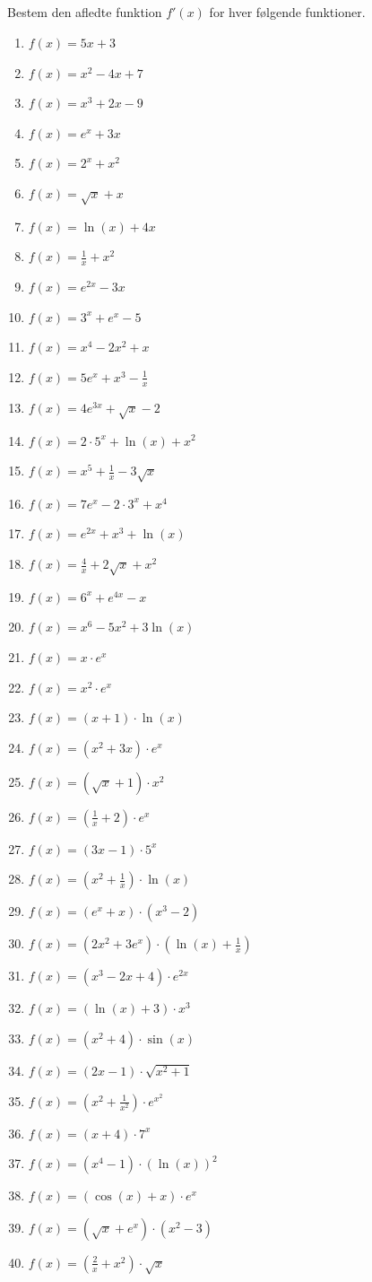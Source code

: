 \documentclass[10pt,a4paper,table]{article}
\begin{document}
\subsection{}
Bestem den afledte funktion $f'(x)$ for hver følgende funktioner.
\begin{enumerate}[label=\arabic*)]
  \item $f(x)=5x+3$
  \item $f(x)=x^2-4x+7$
  \item $f(x)=x^3+2x-9$
  \item $f(x)=e^x+3x$
  \item $f(x)=2^x+x^2$
  \item $f(x)=\sqrt{x}+x$
  \item $f(x)=\ln(x)+4x$
  \item $f(x)=\frac{1}{x}+x^2$
  \item $f(x)=e^{2x}-3x$
  \item $f(x)=3^x+e^x-5$
  \item $f(x)=x^4-2x^2+x$
  \item $f(x)=5e^x+x^3-\frac{1}{x}$
  \item $f(x)=4e^{3x}+\sqrt{x}-2$
  \item $f(x)=2\cdot 5^x+\ln(x)+x^2$
  \item $f(x)=x^5+\frac{1}{x}-3\sqrt{x}$
  \item $f(x)=7e^x-2\cdot 3^x+x^4$
  \item $f(x)=e^{2x}+x^3+\ln(x)$
  \item $f(x)=\frac{4}{x}+2\sqrt{x}+x^2$
  \item $f(x)=6^x+e^{4x}-x$
  \item $f(x)=x^6-5x^2+3\ln(x)$
  \item $f(x)=x\cdot e^x$
  \item $f(x)=x^2\cdot e^x$
  \item $f(x)=(x+1)\cdot \ln(x)$
  \item $f(x)=(x^2+3x)\cdot e^x$
  \item $f(x)=(\sqrt{x}+1)\cdot x^2$
  \item $f(x)=\left(\frac{1}{x}+2\right)\cdot e^x$
  \item $f(x)=(3x-1)\cdot 5^x$
  \item $f(x)=\left(x^2+\frac{1}{x}\right)\cdot \ln(x)$
  \item $f(x)=(e^x+x)\cdot (x^3-2)$
  \item $f(x)=(2x^2+3e^x)\cdot \left(\ln(x)+\frac{1}{x}\right)$
  \item $f(x)=(x^3-2x+4)\cdot e^{2x}$
  \item $f(x)=(\ln(x)+3)\cdot x^3$
  \item $f(x)=(x^2+4)\cdot \sin(x)$
  \item $f(x)=(2x-1)\cdot \sqrt{x^2+1}$
  \item $f(x)=\left(x^2+\frac{1}{x^2}\right)\cdot e^{x^2}$
  \item $f(x)=(x+4)\cdot 7^x$
  \item $f(x)=(x^4-1)\cdot (\ln(x))^2$
  \item $f(x)=(\cos(x)+x)\cdot e^x$
  \item $f(x)=(\sqrt{x}+e^x)\cdot (x^2-3)$
  \item $f(x)=\left(\frac{2}{x}+x^2\right)\cdot \sqrt{x}$
\end{enumerate}
\end{document}
